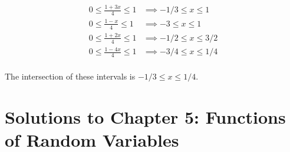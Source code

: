\documentclass[10pt, oneside]{article}
\begin{document}
\begin{enumerate}[label=4.\arabic*]
\begin{align*}
0 \leq \frac{1 + 3x}{4} \leq 1 &\implies -1/3 \leq x \leq 1 \\
0 \leq \frac{1 - x}{4} \leq 1 &\implies -3 \leq x \leq 1 \\
0 \leq \frac{1 + 2x}{4} \leq 1 &\implies -1/2 \leq x \leq 3/2 \\
0 \leq \frac{1 - 4x}{4} \leq 1 &\implies -3/4 \leq x \leq 1/4 \\
\end{align*}

The intersection of these intervals is $\boxed{-1/3 \leq x \leq 1/4}$.

\end{enumerate}

\newpage


\setcounter{cor}{0}
\setcounter{prop}{0}
\setcounter{cor*}{0}

{}
\section*{Solutions to Chapter 5: Functions of Random Variables}
\end{document}
